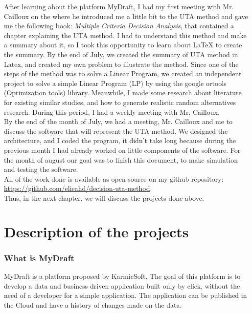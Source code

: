 \documentclass{report}
\begin{document}
After learning about the platform MyDraft, I had my first meeting with Mr. Cailloux on the  where he introduced me a little bit to the UTA method and gave me the following book: \textit{Multiple Criteria Decision Analysis}, that contained a chapter explaining the UTA method. I had to understand this method and make a summary about it, so I took this opportunity to learn about LaTeX to create the summary. By the end of July, we created the summary of UTA method in Latex, and created my own problem to illustrate the method. Since one of the steps of the method was to solve a Linear Program,  we created an independent project to solve a simple Linear Program (LP) by using the google ortools (Optimization tools) library. Meanwhile, I made some research about literature for existing similar studies, and how to generate realistic random alternatives research. During this period, I had a weekly meeting with Mr. Cailloux.\\

By the end of the month of July, we had a meeting, Mr. Cailloux and me to discuss the software that will represent the UTA method. We designed the architecture, and I coded the program, it didn't take long because during the previous month I had already worked on little components of the software. For the month of august our goal was to finish this document, to make simulation and testing the software.\\ 

All of the work done is available as open source on my github repository: \url{ https://github.com/elieahd/decision-uta-method}.\\

Thus, in the next chapter, we will discuss the projects done above.

\chapter{Description of the projects}
\subsection{What is MyDraft}
MyDraft is a platform proposed by KarmicSoft. The goal of this platform is to develop a data and business driven application built only by click, without the need of a developer for a simple application. The application can be published in the Cloud and have a history of changes made on the data.\\
\end{document}
